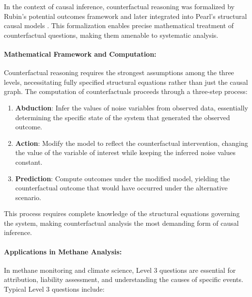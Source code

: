 In the context of causal inference, counterfactual reasoning was formalized by Rubin's potential outcomes framework \cite{Rubin1974} and later integrated into Pearl's structural causal models \cite{Pearl2009}. This formalization enables precise mathematical treatment of counterfactual questions, making them amenable to systematic analysis.

\paragraph{Mathematical Framework and Computation:}

Counterfactual reasoning requires the strongest assumptions among the three levels, necessitating fully specified structural equations rather than just the causal graph. The computation of counterfactuals proceeds through a three-step process:

\begin{enumerate}
	\item \textbf{Abduction}: Infer the values of noise variables from observed data, essentially determining the specific state of the system that generated the observed outcome.

	\item \textbf{Action}: Modify the model to reflect the counterfactual intervention, changing the value of the variable of interest while keeping the inferred noise values constant.

	\item \textbf{Prediction}: Compute outcomes under the modified model, yielding the counterfactual outcome that would have occurred under the alternative scenario.
\end{enumerate}

This process requires complete knowledge of the structural equations governing the system, making counterfactual analysis the most demanding form of causal inference.

\paragraph{Applications in Methane Analysis:}

In methane monitoring and climate science, Level 3 questions are essential for attribution, liability assessment, and understanding the causes of specific events. Typical Level 3 questions include:

